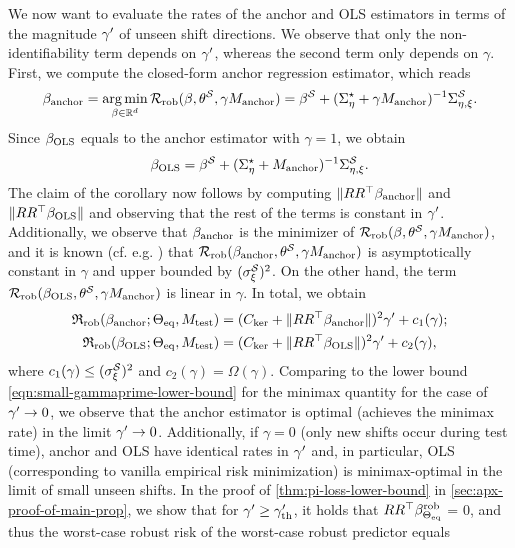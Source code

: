 We now want to evaluate the rates of the anchor and OLS estimators in terms of the magnitude $\gamma'$ of unseen shift directions. We observe that only the non-identifiability term depends on $\gamma'$, whereas the second term only depends on $\gamma$. First, we compute the closed-form anchor regression estimator, which reads 
\begin{equation}
    \beta_{\text{anchor}} = \operatorname*{arg\,min}_{\beta \in \mathbb{R}^d} \mathcal{R}_{\mathrm{rob}}(\beta, \theta^{\mathcal{S}}, \gamma M_{\mathrm{anchor}}) = \beta^{\mathcal{S}} + (\Sigma^\star_{\eta} + \gamma M_{\mathrm{anchor}})^{-1} \Sigma^{\mathcal{S}}_{\eta,\xi}.
\end{equation}
Since $\beta_{\mathrm{OLS}}$ equals to the anchor estimator with $\gamma = 1$, we obtain 
\begin{equation*}
    \beta_{\mathrm{OLS}} = \beta^{\mathcal{S}} + (\Sigma^\star_{\eta} + M_{\mathrm{anchor}})^{-1} \Sigma^{\mathcal{S}}_{\eta,\xi}.
\end{equation*}
The claim of the corollary now follows by computing $\| R R^\top \beta_{\text{anchor}} \|$ and $\| R R^\top \beta_{\mathrm{OLS}} \|$ and observing that the rest of the terms is constant in $\gamma'$. Additionally, we observe that $\beta_{\text{anchor}}$ is the minimizer of $\mathcal{R}_{\mathrm{rob}}(\beta, \theta^{\mathcal{S}}, \gamma M_{\mathrm{anchor}})$, and it is known (cf. e.g. \cite{rothenhausler2021anchor}) that $\mathcal{R}_{\mathrm{rob}}(\beta_{\text{anchor}}, \theta^{\mathcal{S}}, \gamma M_{\mathrm{anchor}})$ is asymptotically constant in $\gamma$ and upper bounded by $({\sigma_\xi^{\mathcal{S}}})^2$. On the other hand, the term $\mathcal{R}_{\mathrm{rob}}(\beta_{\mathrm{OLS}}, \theta^{\mathcal{S}}, \gamma M_{\mathrm{anchor}})$ is linear in $\gamma$. In total, we obtain 
\begin{equation*}
    \begin{aligned}
        \mathfrak{R}_{\mathrm{rob}}(\beta_{\text{anchor}}; \Theta_{\mathrm{eq}}, M_{\mathrm{test}}) &= (C_{\mathrm{ker}} + \| R R^\top \beta_{\text{anchor}} \| )^2\gamma' + c_1(\gamma); \\ 
        \mathfrak{R}_{\mathrm{rob}}(\beta_{\mathrm{OLS}}; \Theta_{\mathrm{eq}},M_{\mathrm{test}}) &= (C_{\mathrm{ker}} + \| R R^\top \beta_{\mathrm{OLS}} \| )^2\gamma' + c_2(\gamma),
    \end{aligned}
\end{equation*}
where $c_1(\gamma) \leq ({\sigma_\xi^{\mathcal{S}}})^2$ and $c_2(\gamma) = \Omega(\gamma)$.
Comparing to the lower bound \eqref{eqn:small-gammaprime-lower-bound} for the minimax quantity for the case of $\gamma' \to 0$, we observe that the anchor estimator is optimal (achieves the minimax rate) in the limit $\gamma' \to 0$. Additionally, if $\gamma = 0$ (only new shifts occur during test time), anchor and OLS have identical rates in $\gamma'$ and, in particular, OLS (corresponding to vanilla empirical risk minimization) is minimax-optimal in the limit of small unseen shifts. 
In the proof of \cref{thm:pi-loss-lower-bound} in \cref{sec:apx-proof-of-main-prop}, we show that for $\gamma' \geq \gamma'_{\mathrm{th}}$, it holds that $R R^\top \beta^{\mathrm{rob}}_{\Theta_{\mathrm{eq}}}$ = 0, and thus the worst-case robust risk of the worst-case robust predictor equals 

